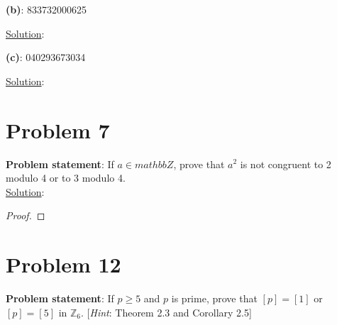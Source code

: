 \documentclass{article} %
\begin{document}
\textbf{(b)}: 833732000625
\\
\begin{addmargin}[1em]{0em}
\underline{Solution}: 
\begin{addmargin}[1em]{0em}

\end{addmargin}
\begin{addmargin}[1em]{0em}
\end{addmargin}
\end{addmargin}

\textbf{(c)}: 040293673034
\\
\begin{addmargin}[1em]{0em}
\underline{Solution}: 
\begin{addmargin}[1em]{0em}

\end{addmargin}
\begin{addmargin}[1em]{0em}
\end{addmargin}
\end{addmargin}

\newpage

\section*{Problem 7}


\textbf{Problem statement}: If $a \in mathbb{Z}$, prove that $a^2$ is not congruent to 2 modulo 4 or to 3 modulo 4.
\\

\underline{Solution}: 
\begin{addmargin}[1em]{0em}
\begin{proof}

\end{proof}
\end{addmargin}

\newpage

\section*{Problem 12}


\textbf{Problem statement}: If $p \geq 5$ and $p$ is prime, prove that $[p] = [1]$ or $[p] = [5]$ in $\mathbb{Z}_6$. [\textit{Hint}: Theorem 2.3 and Corollary 2.5]
\\
\end{document}
